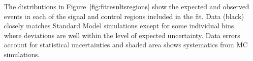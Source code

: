 The distributions in Figure~\ref{fig:fitresultsregions} show the expected and observed events in each of the signal and control regions included in the fit. Data (black) closely matches Standard Model simulations except for some individual bins where deviations are well within the level of expected uncertainty. Data errors account for statistical uncertainties and shaded area shows systematics from MC simulations. 

\begin{figure}[!h]
\centering
  \hfill
  \hfill
  \hfill
  \hfill
\end{figure}
